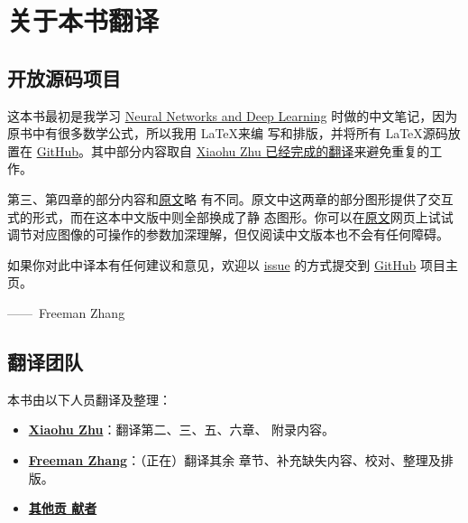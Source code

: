 
\chapter{关于本书翻译}
\label{ch:TranslationTeam}

\section*{开放源码项目}

这本书最初是我学习
\href{http://neuralnetworksanddeeplearning.com/index.html}{Neural Networks and
  Deep Learning} 时做的中文笔记，因为原书中有很多数学公式，所以我用 \LaTeX 来编
写和排版，并将所有 \LaTeX 源码放置在
\href{https://github.com/zhanggyb/nndl}{GitHub}。其中部分内容取自
\href{https://github.com/tigerneil/neural-networks-and-deep-learning-zh-cn}{Xiaohu
  Zhu 已经完成的翻译}来避免重复的工作。

第三、第四章的部分内容和\href{http://neuralnetworksanddeeplearning.com}{原文}略
有不同。原文中这两章的部分图形提供了交互式的形式，而在这本中文版中则全部换成了静
态图形。你可以在\href{http://neuralnetworksanddeeplearning.com}{原文}网页上试试
调节对应图像的可操作的参数加深理解，但仅阅读中文版本也不会有任何障碍。

如果你对此中译本有任何建议和意见，欢迎以
\href{https://github.com/zhanggyb/nndl/issues}{issue} 的方式提交到
\href{https://github.com/zhanggyb/nndl}{GitHub} 项目主页。

\begin{flushright}
  ——~Freeman Zhang
\end{flushright}

\section*{翻译团队}
\label{sec:TranslationTeam}

本书由以下人员翻译及整理：

\begin{itemize}
\item \textbf{\href{mailto:xhzhu.nju@gmail}{Xiaohu Zhu}}：翻译第二、三、五、六章、
  附录内容。
\item \textbf{\href{mailto:zhanggyb@gmail.com}{Freeman Zhang}}：（正在）翻译其余
  章节、补充缺失内容、校对、整理及排版。
\item \textbf{\href{https://github.com/zhanggyb/nndl/graphs/contributors}{其他贡
    献者}}
\end{itemize}
